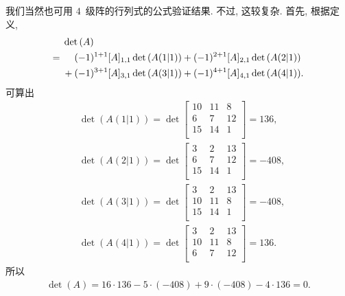 \begin{example}
    我们当然也可用
    \(4\)~级阵的行列式的公式验证结果.
    不过, 这较复杂.
    首先, 根据定义,
    \begin{align*}
             & \det {(A)} \\
        = {} &
        \hphantom{{} + {}}
        (-1)^{1+1} [A]_{1,1} \det {(A(1|1))}
        + (-1)^{2+1} [A]_{2,1} \det {(A(2|1))}
        \\
             &
        + (-1)^{3+1} [A]_{3,1} \det {(A(3|1))}
        + (-1)^{4+1} [A]_{4,1} \det {(A(4|1))}.
    \end{align*}
    可算出
    \begin{align*}
         & \det {(A(1|1))}
        = \det {\begin{bmatrix}
                        10 & 11 & 8  \\
                        6  & 7  & 12 \\
                        15 & 14 & 1  \\
                    \end{bmatrix}}
        = 136,             \\
         & \det {(A(2|1))}
        = \det {\begin{bmatrix}
                        3  & 2  & 13 \\
                        6  & 7  & 12 \\
                        15 & 14 & 1  \\
                    \end{bmatrix}}
        = -408,            \\
         & \det {(A(3|1))}
        = \det {\begin{bmatrix}
                        3  & 2  & 13 \\
                        10 & 11 & 8  \\
                        15 & 14 & 1  \\
                    \end{bmatrix}}
        = -408,            \\
         & \det {(A(4|1))}
        = \det {\begin{bmatrix}
                        3  & 2  & 13 \\
                        10 & 11 & 8  \\
                        6  & 7  & 12 \\
                    \end{bmatrix}}
        = 136.
    \end{align*}
    所以
    \begin{align*}
        \det {(A)}
        = 16 \cdot 136 - 5 \cdot (-408)
        + 9 \cdot (-408) - 4 \cdot 136
        = 0.
    \end{align*}
\end{example}

